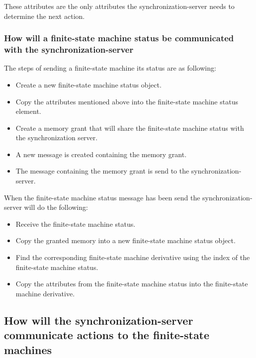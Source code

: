 These attributes are the only attributes the synchronization-server
needs to determine the next action.

\hypertarget{how-will-a-finite-state-machine-status-be-communicated-with-the-synchronization-server}{%
\subsubsection{How will a finite-state machine status be communicated
with the
synchronization-server}\label{how-will-a-finite-state-machine-status-be-communicated-with-the-synchronization-server}}

The steps of sending a finite-state machine its status are as following:

\begin{itemize}
\tightlist
\item
  Create a new finite-state machine status object.
\item
  Copy the attributes mentioned above into the finite-state machine
  status element.
\item
  Create a memory grant that will share the finite-state machine status
  with the synchronization server.
\item
  A new message is created containing the memory grant.
\item
  The message containing the memory grant is send to the
  synchronization-server.
\end{itemize}

When the finite-state machine status message has been send the
synchronization-server will do the following:

\begin{itemize}
\tightlist
\item
  Receive the finite-state machine status.
\item
  Copy the granted memory into a new finite-state machine status object.
\item
  Find the corresponding finite-state machine derivative using the index
  of the finite-state machine status.
\item
  Copy the attributes from the finite-state machine status into the
  finite-state machine derivative.
\end{itemize}

\hypertarget{how-will-the-synchronization-server-communicate-actions-to-the-finite-state-machines}{%
\subsection{How will the synchronization-server communicate actions to
the finite-state
machines}\label{how-will-the-synchronization-server-communicate-actions-to-the-finite-state-machines}}

